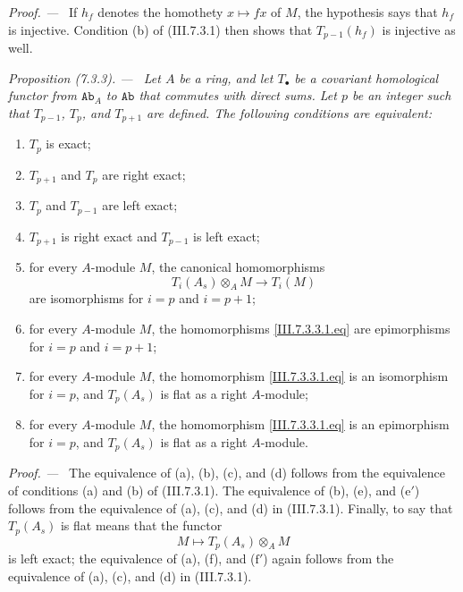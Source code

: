 \documentclass[10pt,oneside]{book}
\newcommand{\cat}[1]{\mathtt{#1}}
\newcommand{\sref}[2][]{(#2)}
\newenvironment{proposition}[1][]{\par\medskip\noindent\itshape Proposition (#1). ---\ }{\par}
\newenvironment{proof}{\par\medskip\noindent\textit{Proof. ---\ }}{\par}
\begin{document}
\begin{proof}
If $h_f$ denotes the homothety $x\mapsto fx$ of $M$, the
hypothesis says that $h_f$ is injective.  Condition (b) of
\sref{III.7.3.1} then shows that $T_{p-1}(h_f)$ is injective
as well.
\end{proof}

\begin{proposition}[7.3.3]
\label{III.7.3.3}
Let $A$ be a ring, and let $T_\bullet$ be a covariant
homological functor from $\cat{Ab}_A$ to $\cat{Ab}$ that
commutes with direct sums.  Let $p$ be an integer such that
$T_{p-1}$, $T_p$, and $T_{p+1}$ are defined.  The following
conditions are equivalent:
\begin{enumerate}
  \item[(a)] $T_p$ is exact;
  \item[(b)] $T_{p+1}$ and $T_p$ are right exact;
  \item[(c)] $T_p$ and $T_{p-1}$ are left exact;
  \item[(d)] $T_{p+1}$ is right exact and $T_{p-1}$ is left
    exact;
  \item[(e)] for every $A$-module $M$, the canonical
    homomorphisms
    \[
      T_i(A_s)\otimes_A M
      \longrightarrow
      T_i(M)
      \tag{7.3.3.1}\label{III.7.3.3.1.eq}
    \]
    are isomorphisms for $i=p$ and $i=p+1$;
  \item[($\mathrm{e}'$)] for every $A$-module $M$, the
    homomorphisms \eqref{III.7.3.3.1.eq} are epimorphisms for
    $i=p$ and $i=p+1$;
  \item[(f)] for every $A$-module $M$, the homomorphism
    \eqref{III.7.3.3.1.eq} is an isomorphism for $i=p$, and
    $T_p(A_s)$ is flat as a right $A$-module;
  \item[($\mathrm{f}'$)] for every $A$-module $M$, the
    homomorphism \eqref{III.7.3.3.1.eq} is an epimorphism for
    $i=p$, and $T_p(A_s)$ is flat as a right $A$-module.
\end{enumerate}
\end{proposition}

\begin{proof}
The equivalence of (a), (b), (c), and (d) follows from the
equivalence of conditions (a) and (b) of \sref{III.7.3.1}.
The equivalence of (b), (e), and ($\mathrm{e}'$) follows from
the equivalence of (a), (c), and (d) in \sref{III.7.3.1}.
Finally, to say that $T_p(A_s)$ is flat means that the functor
\[
  M\longmapsto T_p(A_s)\otimes_A M
\]
is left exact; the equivalence of (a), (f), and
($\mathrm{f}'$) again follows from the equivalence of (a), (c),
and (d) in \sref{III.7.3.1}.
\end{proof}
\end{document}
